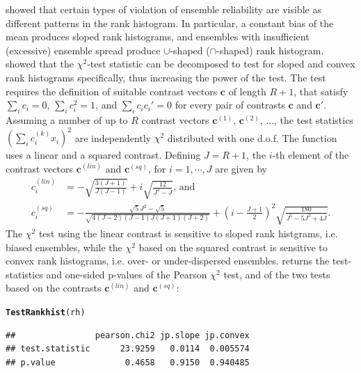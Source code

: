 \documentclass[article]{jss}\usepackage{graphicx, color}
\makeatletter
\newcommand{\hlfunctioncall}[1]{\textcolor[rgb]{0,0.501960784313725,0.752941176470588}{\textbf{#1}}}%
\newenvironment{kframe}{%
 \def\at@end@of@kframe{}%
 \ifinner\ifhmode%
  \def\at@end@of@kframe{\end{minipage}}%
  \begin{minipage}{\columnwidth}%
 \fi\fi%
 \def\FrameCommand##1{\hskip\@totalleftmargin \hskip-\fboxsep
 \colorbox{shadecolor}{##1}\hskip-\fboxsep
     \hskip-\linewidth \hskip-\@totalleftmargin \hskip\columnwidth}%
 \MakeFramed {\advance\hsize-\width
   \@totalleftmargin\z@ \linewidth\hsize
   \@setminipage}}%
 {\par\unskip\endMakeFramed%
 \at@end@of@kframe}
\newenvironment{knitrout}{}{} %
\makeatother
\begin{document}
\citet{hamill2001interpretation} showed that certain types of violation of ensemble reliability are visible as different patterns in the rank histogram.
In particular, a constant bias of the mean produces sloped rank histograms, and ensembles with insufficient (excessive) ensemble spread produce $\cup$-shaped ($\cap$-shaped) rank histogram.
\citet{jolliffe2008evaluating} showed that the $\chi^2$-test statistic can be decomposed to test for sloped and convex rank histograms specifically, thus increasing the power of the test.
The test requires the definition of suitable contrast vectors $\mathbf{c}$ of length $R+1$, that satisfy $\sum_i c_i = 0$, $\sum_i c_i^2 = 1$, and $\sum_i c_i c_i' = 0$ for every pair of contrasts $\mathbf{c}$ and $\mathbf{c}'$.
Assuming a number of up to $R$ contrast vectors $\mathbf{c}^{(1)}$, $\mathbf{c}^{(2)}$, $\dots$, the test statistics $(\sum_i c^{(k)}_i x_i)^2$ are independently $\chi^2$ distributed with one d.o.f. 
The function  uses a linear and a squared contrast. Defining $J=R+1$, the $i$-th element of the contrast vectors $\mathbf{c}^{(lin)}$ and $\mathbf{c}^{(sq)}$, for $i=1,\cdots,J$ are given by
%
\begin{align}
c^{(lin)}_i & = -\sqrt{\frac{3(J+1)}{J (J-1)}} + i \sqrt{\frac{12}{J^3 - J}}\text{, and}\\
c^{(sq)}_i & =  - \frac{\sqrt{5}  J^2 - \sqrt{5}}{\sqrt{4(J - 2)  (J-1) J (J+1) (J+2)}}+ \left(i - \frac{J+1}{2}\right)^2   \sqrt{\frac{180}{ J^5 - 5 J^3 + 4 J}}.
\end{align}
%
The $\chi^2$ test using the linear contrast is sensitive to sloped rank histgrams, i.e. biased ensembles, while the $\chi^2$ based on the squared contrast is sensitive to convex rank histograms, i.e. over- or under-dispersed ensembles.
 returns the test-statistics and one-sided p-values of the Pearson $\chi^2$ test, and of the two tests based on the contrasts $\mathbf{c}^{(lin)}$ and $\mathbf{c}^{(sq)}$:

\begin{knitrout}
\color{fgcolor}\begin{kframe}
\begin{alltt}
\hlfunctioncall{TestRankhist}(rh)
\end{alltt}
\begin{verbatim}
##                pearson.chi2 jp.slope jp.convex
## test.statistic      23.9259   0.0114  0.005574
## p.value              0.4658   0.9150  0.940485
\end{verbatim}
\end{kframe}
\end{knitrout}
\end{document}

